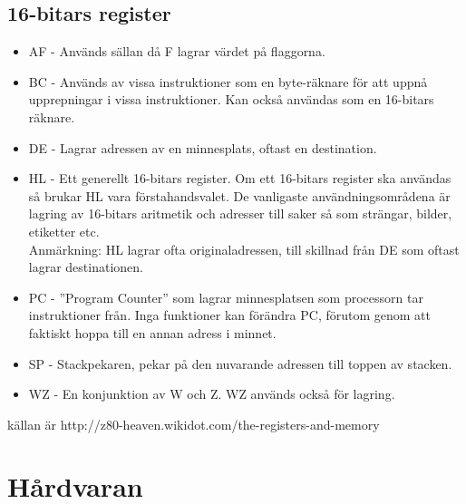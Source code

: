 \documentclass{article}
\begin{document}
\subsection{16-bitars register}
\begin{itemize}
    \item AF - Används sällan då F lagrar värdet på flaggorna.
    \item BC - Används av vissa instruktioner som en byte-räknare för att uppnå upprepningar i vissa instruktioner. Kan också användas som en 16-bitars räknare.
    \item DE - Lagrar adressen av en minnesplats, oftast en destination.
    \item HL - Ett generellt 16-bitars register. Om ett 16-bitars register ska användas så brukar HL vara förstahandsvalet. De vanligaste användningsområdena är lagring av 16-bitars aritmetik och adresser till saker så som strängar, bilder, etiketter etc.\\
    Anmärkning: HL lagrar ofta originaladressen, till skillnad från DE som oftast lagrar destinationen.
    \item PC - ''Program Counter'' som lagrar minnesplatsen som processorn tar instruktioner från. Inga funktioner kan förändra PC, förutom genom att faktiskt hoppa till en annan adress i minnet.
    \item SP - Stackpekaren, pekar på den nuvarande adressen till toppen av stacken.
    \item WZ - En konjunktion av W och Z. WZ används också för lagring.
\end{itemize}

källan är http://z80-heaven.wikidot.com/the-registers-and-memory
\clearpage
\section{Hårdvaran}
\subsection{}
\end{document}

